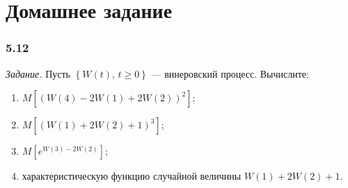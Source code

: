 \section*{Домашнее задание}

\subsubsection*{5.12}

\textit{Задание.}
Пусть $ \left\{ W \left( t \right), \, t \geq 0 \right\} $ --- винеровский процесс.
Вычислите:
\begin{enumerate}[label=\alph*)]
  \item $M \left[
      \left( W \left( 4 \right) - 2W \left( 1 \right) + 2W \left( 2 \right) \right)^2 \right] $;
  \item $M \left[ \left( W \left( 1 \right) + 2W \left( 2 \right) + 1 \right)^3 \right] $;
  \item $M \left[ e^{W \left( 3 \right) - 2W \left( 2 \right) } \right] $;
  \item характеристическую функцию случайной величины $W \left( 1 \right) + 2W \left( 2 \right) + 1$.
\end{enumerate}

